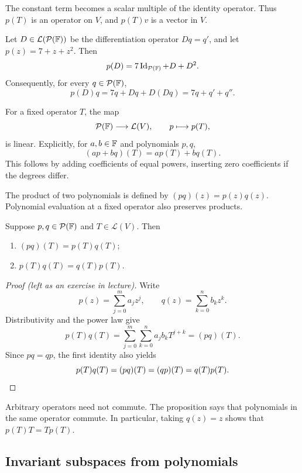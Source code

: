 The constant term becomes a scalar multiple of the identity operator.
Thus $p(T)$ is an operator on $V$, and $p(T)v$ is a vector in $V$.

\begin{example}
  Let $D\in\mathcal L(\mathcal P(\mathbb{F}))$ be the differentiation
  operator $Dq=q'$, and let $p(z)=7+z+z^2$. Then
  \[
    p(D)=7\operatorname{Id}_{\mathcal P(\mathbb{F})}+D+D^2.
  \]
  Consequently, for every $q\in\mathcal P(\mathbb{F})$,
  \[
    p(D)q=7q+Dq+D(Dq)=7q+q'+q''.
  \]
\end{example}

For a fixed operator $T$, the map
\[
  \mathcal P(\mathbb{F})\longrightarrow\mathcal L(V),
  \qquad p\longmapsto p(T),
\]
is linear. Explicitly, for $a,b\in\mathbb{F}$ and polynomials $p,q$,
\[
  (ap+bq)(T)=ap(T)+bq(T).
\]
This follows by adding coefficients of equal powers, inserting zero
coefficients if the degrees differ.

The product of two polynomials is defined by
$(pq)(z)=p(z)q(z)$. Polynomial evaluation at a fixed operator also
preserves products.

\begin{proposition}\label{prop:operator-polynomial-products}
  Suppose $p,q\in\mathcal P(\mathbb{F})$ and $T\in\mathcal L(V)$. Then
  \begin{enumerate}[label=(\roman*)]
    \item $(pq)(T)=p(T)q(T)$;
    \item $p(T)q(T)=q(T)p(T)$.
  \end{enumerate}
\end{proposition}

\begin{proof}[Proof (left as an exercise in lecture)]
  Write
  \[
    p(z)=\sum_{j=0}^m a_jz^j,\qquad
    q(z)=\sum_{k=0}^n b_kz^k.
  \]
  Distributivity and the power law give
  \[
    p(T)q(T)=\sum_{j=0}^m\sum_{k=0}^n a_jb_kT^{j+k}
      =(pq)(T).
  \]
  Since $pq=qp$, the first identity also yields
  \[
    p(T)q(T)=(pq)(T)=(qp)(T)=q(T)p(T).\qedhere
  \]
\end{proof}

\begin{remark}
  Arbitrary operators need not commute. The proposition says that
  polynomials in the same operator commute. In particular, taking
  $q(z)=z$ shows that $p(T)T=Tp(T)$.
\end{remark}

\subsection{Invariant subspaces from polynomials}

